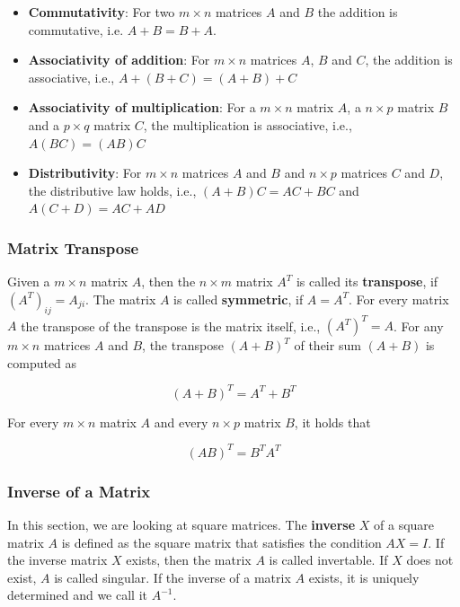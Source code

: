 \documentclass[]{book}
\providecommand{\tightlist}{%
  \setlength{\itemsep}{0pt}\setlength{\parskip}{0pt}}
\theoremstyle{definition}
\theoremstyle{definition}
\theoremstyle{definition}
\theoremstyle{remark}
\begin{document}
\begin{itemize}
\tightlist
\item
  \textbf{Commutativity}: For two \(m\times n\) matrices \(A\) and \(B\) the addition is commutative, i.e. \(A + B = B + A\).
\item
  \textbf{Associativity of addition}: For \(m\times n\) matrices \(A\), \(B\) and \(C\), the addition is associative, i.e., \(A + (B + C) = (A + B) + C\)
\item
  \textbf{Associativity of multiplication}: For a \(m\times n\) matrix \(A\), a \(n \times p\) matrix \(B\) and a \(p \times q\) matrix \(C\), the multiplication is associative, i.e., \(A(BC) = (AB)C\)
\item
  \textbf{Distributivity}: For \(m\times n\) matrices \(A\) and \(B\) and \(n\times p\) matrices \(C\) and \(D\), the distributive law holds, i.e., \((A+B)C = AC + BC\) and \(A(C + D) = AC + AD\)
\end{itemize}

\hypertarget{intro-linalg-laws-matrix-transpose}{%
\subsubsection{Matrix Transpose}\label{intro-linalg-laws-matrix-transpose}}

Given a \(m\times n\) matrix \(A\), then the \(n\times m\) matrix \(A^T\) is called its \textbf{transpose}, if \((A^T)_{ij} = A_{ji}\). The matrix \(A\) is called \textbf{symmetric}, if \(A = A^T\). For every matrix \(A\) the transpose of the transpose is the matrix itself, i.e., \((A^T)^T = A\). For any \(m\times n\) matrices \(A\) and \(B\), the transpose \((A+B)^T\) of their sum \((A+B)\) is computed as

\[(A+B)^T = A^T + B^T\]

For every \(m\times n\) matrix \(A\) and every \(n\times p\) matrix \(B\), it holds that

\[(AB)^T = B^T A^T\]

\hypertarget{intro-linalg-inverse-matrix}{%
\subsubsection{Inverse of a Matrix}\label{intro-linalg-inverse-matrix}}

In this section, we are looking at square matrices. The \textbf{inverse} \(X\) of a square matrix \(A\) is defined as the square matrix that satisfies the condition \(AX = I\). If the inverse matrix \(X\) exists, then the matrix \(A\) is called invertable. If \(X\) does not exist, \(A\) is called singular. If the inverse of a matrix \(A\) exists, it is uniquely determined and we call it \(A^{-1}\).
\end{document}
